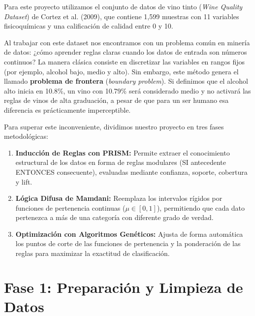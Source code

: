 \documentclass[11pt,a4paper]{article}
\begin{document}
Para este proyecto utilizamos el conjunto de datos de vino tinto (\textit{Wine Quality Dataset}) de Cortez et al. (2009), que contiene 1,599 muestras con 11 variables fisicoquímicas y una calificación de calidad entre 0 y 10. 

Al trabajar con este dataset nos encontramos con un problema común en minería de datos: ¿cómo aprender reglas claras cuando los datos de entrada son números continuos? La manera clásica consiste en discretizar las variables en rangos fijos (por ejemplo, alcohol bajo, medio y alto). Sin embargo, este método genera el llamado \textbf{problema de frontera} (\textit{boundary problem}). Si definimos que el alcohol alto inicia en 10.8\%, un vino con 10.79\% será considerado medio y no activará las reglas de vinos de alta graduación, a pesar de que para un ser humano esa diferencia es prácticamente imperceptible.

Para superar este inconveniente, dividimos nuestro proyecto en tres fases metodológicas:
\begin{enumerate}[noitemsep]
    \item \textbf{Inducción de Reglas con PRISM:} Permite extraer el conocimiento estructural de los datos en forma de reglas modulares (SI antecedente ENTONCES consecuente), evaluadas mediante confianza, soporte, cobertura y lift.
    \item \textbf{Lógica Difusa de Mamdani:} Reemplaza los intervalos rígidos por funciones de pertenencia continuas ($\mu \in [0, 1]$), permitiendo que cada dato pertenezca a más de una categoría con diferente grado de verdad.
    \item \textbf{Optimización con Algoritmos Genéticos:} Ajusta de forma automática los puntos de corte de las funciones de pertenencia y la ponderación de las reglas para maximizar la exactitud de clasificación.
\end{enumerate}

\section{Fase 1: Preparación y Limpieza de Datos}
\end{document}
